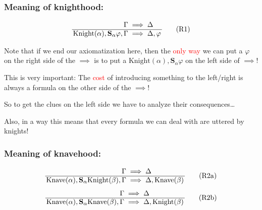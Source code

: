 \documentclass[xcolor=x11names]{beamer}
\newcommand{\bemph}[1] {{\color{DeepSkyBlue3}{#1}}}
\newcommand{\cemph}[1]{\textcolor{red}{#1}}
\newcommand{\says}[1]{\mathbf{S}_{#1}}
\newcommand{\isa}[2]{\mathrm{#2}(#1)}
\begin{document}
\begin{frame}
  \frametitle{Meaning of knighthood:}
\pause
    {\Large \[ \arraycolsep = 0.5mm \begin{array}{rcl}
       \Gamma &\implies& \Delta
    \\ \hline
        \isa{\alpha}{Knight}, \says \alpha \varphi,\Gamma&\implies& \Delta, \varphi
    \end{array}\tag{R1}\]}
\bigskip

Note that if we end our axiomatization here, then the \cemph{only way} we can put a $\varphi$ on the right side of the $\implies$ is to put a $\isa{\alpha}{Knight}, \says \alpha \varphi$ on the left side of $\implies$!

\bigskip

This is very important: The \cemph{cost} of introducing something to the left/right is always a formula on the other side of the $\implies$!

\bigskip

So to get the clues on the left side we have to analyze their consequences\dots

\bigskip

Also, in a way this means that every formula we can deal with are uttered by knights!

\end{frame}

\begin{frame}
  \frametitle{Meaning of knavehood:}
\pause
    {\Large \[ \arraycolsep = 0.5mm \begin{array}{rcl}
       \Gamma &\implies& \Delta
    \\ \hline
        \isa{\alpha}{Knave}, \says \alpha \isa{\beta}{Knight},\Gamma &\implies& \Delta, \isa{\beta}{Knave}
    \end{array}\tag{R2a}\]}
\bigskip
\pause
    {\Large \[ \arraycolsep = 0.5mm \begin{array}{rcl}
       \Gamma &\implies& \Delta
    \\ \hline
        \isa{\alpha}{Knave}, \says \alpha \isa{\beta}{Knave},\Gamma &\implies& \Delta, \isa{\beta}{Knight}
    \end{array}\tag{R2b}\]}
\bigskip

\end{frame}
\end{document}
